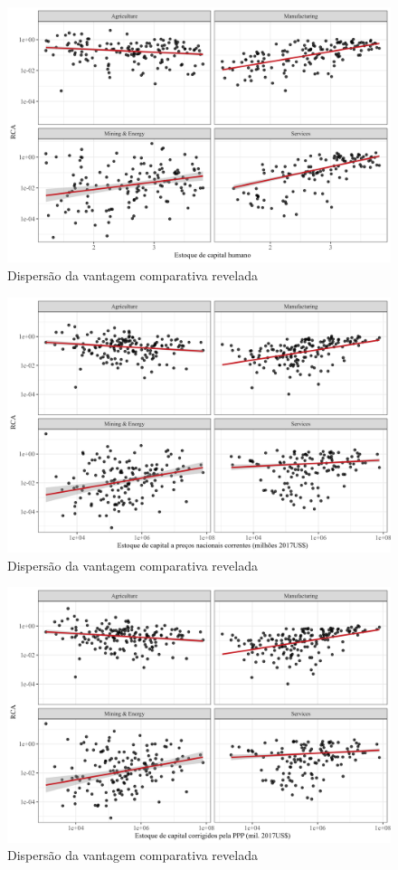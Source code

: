 \begin{figure}[!h]
    \centering
    \caption{Dispersão da vantagem comparativa revelada}
    \includegraphics*[width = 0.8\linewidth]{../plots/rca_hc.png}

\end{figure}


\begin{figure}[!h]
    \centering
    \caption{Dispersão da vantagem comparativa revelada}
    \includegraphics*[width = 0.8\linewidth]{../plots/rca_k_constant.png}

\end{figure}

\begin{figure}[!h]
    \centering
    \caption{Dispersão da vantagem comparativa revelada}
    \includegraphics*[width = 0.8\linewidth]{../plots/rca_k_ppp.png}

\end{figure}

